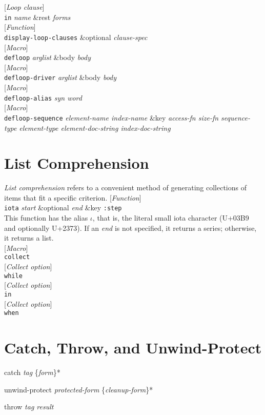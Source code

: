 \documentclass[10pt]{book}
\newenvironment{defother}[2]{[\textit{#1}]\\\texttt{#2}}{\\}
\newenvironment{defun}[1]{\begin{defother}{Function}{#1}}{\end{defother}}
\newenvironment{defmacro}[1]{\begin{defother}{Macro}{#1}}{\end{defother}}
\newenvironment{special-form}[1]{\begin{defother}{Special form}{#1}}{\end{defother}}
\begin{document}
\begin{defother}{Loop clause}{in} \textit{name} \&rest \textit{forms}\end{defother}
\begin{defun}{display-loop-clauses} \&optional \textit{clause-spec}\end{defun}
\begin{defmacro}{defloop} \textit{arglist} \&body \textit{body} \end{defmacro}
\begin{defmacro}{defloop-driver} \textit{arglist} \&body \textit{body}\end{defmacro}
\begin{defmacro}{defloop-alias} \textit{syn word}\end{defmacro}
\begin{defmacro}{defloop-sequence} \textit{element-name index-name} \&key \textit{access-fn size-fn sequence-type element-type element-doc-string index-doc-string}\end{defmacro}

\section{List Comprehension}
\textit{List comprehension} refers to a convenient method of generating collections of items that fit a specific criterion.
\begin{defun}{iota} \textit{start} \&optional \textit{end} \&key \texttt{:step}\\
This function has the alias $\iota$, that is, the literal small iota character (U+03B9 and optionally U+2373). If an \textit{end} is not specified, it returns a series; otherwise, it returns a list.\end{defun}
\begin{defmacro}{collect} \end{defmacro}
\begin{defother}{Collect option}{while}\end{defother}
\begin{defother}{Collect option}{in}\end{defother}
\begin{defother}{Collect option}{when}\end{defother}

\section{Catch, Throw, and Unwind-Protect}
\begin{special-form}{catch} \textit{tag} \{\textit{form}\}*\end{special-form}
\begin{special-form}{unwind-protect} \textit{protected-form} \{\textit{cleanup-form}\}*\end{special-form}
\begin{special-form}{throw} \textit{tag result}\end{special-form}
\end{document}
